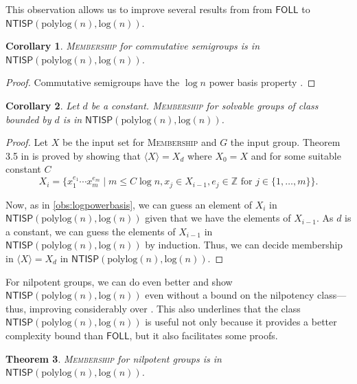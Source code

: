 \documentclass{article}
\newtheorem{theorem}{Theorem}\newtheorem{lemma}[theorem]{Lemma}\newtheorem{proposition}[theorem]{Proposition}\newtheorem{corollary}[theorem]{Corollary}\newtheorem{definition}[theorem]{Definition}\newtheorem{claim}[theorem]{Claim}\newtheorem{remark}[theorem]{Remark}\newtheorem{observation}[theorem]{Observation}\newtheorem{conjecture}[theorem]{Conjecture}\newtheorem{example}[theorem]{Example}
\newcommand{\algprobm}[1]{\textsc{#1}\xspace}
\newcommand{\Z}{\mathbb{Z}}
\newcommand*{\ComplexityClass}[1]{\ensuremath{\mathsf{#1}}\xspace}
\newcommand{\NTISP}{\ComplexityClass{NTISP}}
\newcommand{\NTISPpll}{\ensuremath{\NTISP(\mathrm{polylog}(n),\mathrm{log}(n))}\xspace}
\newcommand{\FOLL}{\ComplexityClass{FOLL}}
\begin{document}
This observation allows us to improve several results from \cite{BKLM,Fleischer} from \FOLL to \\ \NTISPpll.

\begin{corollary} \label{cor:cayley_abelian}
\algprobm{Membership} for commutative semigroups is in $\NTISPpll$. 
\end{corollary}

\begin{proof} 
Commutative semigroups have the $\log n$ power basis property \cite[Lem.~4.2]{Fleischer}.
\end{proof}


\begin{corollary} 
Let $d$ be a constant. 
\algprobm{Membership} for solvable groups of class bounded by $d$ is in $\NTISPpll$. 
\end{corollary}


\begin{proof}
    Let $X$ be the input set for \algprobm{Membership} and $G$ the input group. 
Theorem 3.5 in \cite{BKLM} is proved by showing that $\langle X  \rangle = X_{d}$ where $X_0 = X$ and for some suitable constant $C$
\[X_i = \{x_1^{e_1} \cdots x_m^{e_m} \mid m \leq C \log n, x_j \in X_{i-1}, e_j \in \Z \text{ for } j \in \{1, \dots, m\}\}.\]

Now, as in \cref{obs:logpowerbasis}, we can guess an element of $X_i$ in \NTISPpll{} given that we have the elements of $X_{i-1}$. As $d$ is a constant, we can guess the elements of $X_{i-1}$ in \NTISPpll{} by induction. Thus, we can decide membership in   $\langle X  \rangle = X_{d}$   in \NTISPpll.
\end{proof}


For nilpotent groups, we can do even better and show \NTISPpll{} even without a bound on the nilpotency class---thus, improving considerably over \cite{BKLM}. This also underlines that the class \NTISPpll{} is useful not only because it provides a better complexity bound than \FOLL, but it also facilitates some proofs.
 
\begin{theorem} 
\algprobm{Membership} for nilpotent groups is in \NTISPpll.
\end{theorem}
\end{document}
